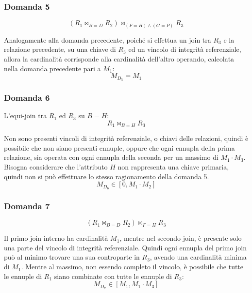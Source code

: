 \documentclass{article}
\numberwithin{equation}{subsection}
\begin{document}
\subsubsection*{Domanda 5}

\begin{equation*}
    (R_1\Join_{B=D}R_2)\Join_{(F=H)\land(G=P)}R_3
\end{equation*}

Analogamente alla domanda precedente, poiché si effettua un join tra $R_3$ e la relazione precedente, su una chiave di $R_3$ ed un vincolo di integrità referenziale, allora la cardinalità 
corrisponde alla cardinalità dell'altro operando, calcolata nella domanda precedente pari a $M_1$:
\begin{equation}
    M_{D_5}=M_1
\end{equation}

\subsubsection*{Domanda 6}

L'equi-join tra $R_1$ ed $R_3$ su $B=H$:
\begin{equation*}
    R_1\Join_{B=H}R_3
\end{equation*}

Non sono presenti vincoli di integrità referenziale, o chiavi delle relazioni, quindi è possibile che non siano presenti ennuple, oppure che ogni ennupla della prima relazione, sia operata 
con ogni ennupla della seconda per un massimo di $M_1\cdot M_3$. Bisogna considerare che l'attributo $H$ non rappresenta una chiave primaria, quindi non si può effettuare lo stesso 
ragionamento della domanda 5. 
\begin{equation}
    M_{D_6}\in[0,M_1\cdot M_2]
\end{equation}

\subsubsection*{Domanda 7}

\begin{equation*}
    (R_1\Join_{B=D}R_2)\Join_{F=H}R_3
\end{equation*}

Il primo join interno ha cardinalità $M_1$, mentre nel secondo join, è presente solo una parte del vincolo di integrità referenziale. Quindi ogni ennupla del primo join può al minimo 
trovare una sua controparte in $R_3$, avendo una cardinalità minima di $M_1$. Mentre al massimo, non essendo completo il vincolo, è possibile che tutte le ennuple di $R_1$ siano combinate 
con tutte le ennuple di $R_3$:
\begin{equation}
    M_{D_7}\in[M_1,M_1\cdot M_3]
\end{equation}
\end{document}
